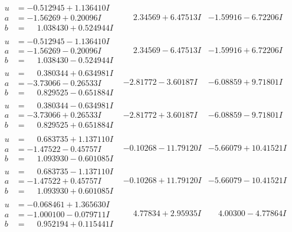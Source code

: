 \documentclass[1p]{elsarticle_modified}
\theoremstyle{definition}
\begin{document}
$$\begin{array}{c|c|c}
\begin{aligned}
u &= -0.512945 + 1.136410 I \\
a &= -1.56269 + 0.20096 I \\
b &= \phantom{-}1.038430 + 0.524944 I\end{aligned}
 & \phantom{-}2.34569 + 6.47513 I & -1.59916 - 6.72206 I \\ \hline\begin{aligned}
u &= -0.512945 - 1.136410 I \\
a &= -1.56269 - 0.20096 I \\
b &= \phantom{-}1.038430 - 0.524944 I\end{aligned}
 & \phantom{-}2.34569 - 6.47513 I & -1.59916 + 6.72206 I \\ \hline\begin{aligned}
u &= \phantom{-}0.380344 + 0.634981 I \\
a &= -3.73066 - 0.26533 I \\
b &= \phantom{-}0.829525 - 0.651884 I\end{aligned}
 & -2.81772 - 3.60187 I & -6.08859 + 9.71801 I \\ \hline\begin{aligned}
u &= \phantom{-}0.380344 - 0.634981 I \\
a &= -3.73066 + 0.26533 I \\
b &= \phantom{-}0.829525 + 0.651884 I\end{aligned}
 & -2.81772 + 3.60187 I & -6.08859 - 9.71801 I \\ \hline\begin{aligned}
u &= \phantom{-}0.683735 + 1.137110 I \\
a &= -1.47522 - 0.45757 I \\
b &= \phantom{-}1.093930 - 0.601085 I\end{aligned}
 & -0.10268 - 11.79120 I & -5.66079 + 10.41521 I \\ \hline\begin{aligned}
u &= \phantom{-}0.683735 - 1.137110 I \\
a &= -1.47522 + 0.45757 I \\
b &= \phantom{-}1.093930 + 0.601085 I\end{aligned}
 & -0.10268 + 11.79120 I & -5.66079 - 10.41521 I \\ \hline\begin{aligned}
u &= -0.068461 + 1.365630 I \\
a &= -1.000100 - 0.079711 I \\
b &= \phantom{-}0.952194 + 0.115441 I\end{aligned}
 & \phantom{-}4.77834 + 2.95935 I & \phantom{-}4.00300 - 4.77864 I \\ \hline\begin{aligned}

\end{aligned}
\end{array}$$
\end{document}

